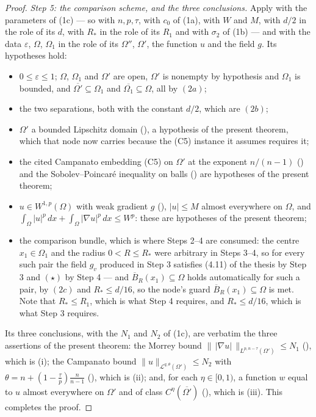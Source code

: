 \begin{proof}
\emph{Step 5: the comparison scheme, and the three conclusions.}  Apply
 with the parameters of (1c) --- so with
$n,p,\tau$, with $c_0$ of (1a), with $W$ and $M$, with $d/2$ in the role of its
$d$, with $R_\ast$ in the role of its $R_1$ and with $\sigma_2$ of (1b) --- and
with the data $\varepsilon$, $\Omega$, $\Omega_1$ in the role of
its $\Omega''$, $\Omega'$, the function $u$ and the field $g$.  Its hypotheses
hold:
\begin{itemize}
\item $0\le\varepsilon\le1$; $\Omega$, $\Omega_1$ and $\Omega'$ are
  open, $\Omega'$ is nonempty by hypothesis and $\Omega_1$ is bounded, and
  $\overline{\Omega'}\subseteq\Omega_1$ and
  $\overline{\Omega_1}\subseteq\Omega$, all by $(2a)$;
\item the two separations, both with the constant $d/2$, which are $(2b)$;
\item $\Omega'$ a bounded Lipschitz domain
  (), a hypothesis of the present theorem,
  which that node now carries because the (C5) instance it assumes requires it;
\item the cited Campanato embedding (C5) on $\Omega'$ at the exponent
  $n/(n-1)$ () and the Sobolev--Poincar\'e
  inequality on balls () are hypotheses of the
  present theorem;
\item $u\in W^{1,p}(\Omega)$ with weak gradient $g$ (),
  $|u|\le M$ almost everywhere on $\Omega$, and
  $\int_\Omega|u|^p\,dx+\int_\Omega|\nabla u|^p\,dx\le W^p$: these are
  hypotheses of the present theorem;
\item the comparison bundle, which is where Steps 2--4 are consumed: the
  centre $x_1\in\Omega_1$ and the radius $0<R\le R_\ast$ were arbitrary in
  Steps 3--4, so for every such pair the field $g_v$ produced in
  Step 3 satisfies (4.11) of the thesis by Step 3 and $(\star)$ by Step 4 --- and
  $\overline B_R(x_1)\subseteq\Omega$ holds automatically for such a pair, by
  $(2c)$ and $R_\ast\le d/16$, so the node's guard
  $\overline B_R(x_1)\subseteq\Omega$ is met.  Note that $R_\ast\le R_1$,
  which is what Step 4 requires, and $R_\ast\le d/16$, which is what Step 3
  requires.
\end{itemize}
Its three conclusions, with the $N_1$ and $N_2$ of (1c), are verbatim the three
assertions of the present theorem: the Morrey bound
$\|\,|\nabla u|\,\|_{L^{p,n-\tau}(\Omega')}\le N_1$
(), which is (i); the Campanato bound
$\|u\|_{\mathcal L^{q,\theta}(\Omega')}\le N_2$ with
$\theta=n+(1-\frac\tau p)\frac n{n-1}$ (), which is
(ii); and, for each $\eta\in[0,1)$, a function $w$ equal to $u$ almost
everywhere on $\Omega'$ and of class $C^\eta(\overline{\Omega'})$
(), which is (iii).  This completes the proof.
\end{proof}
